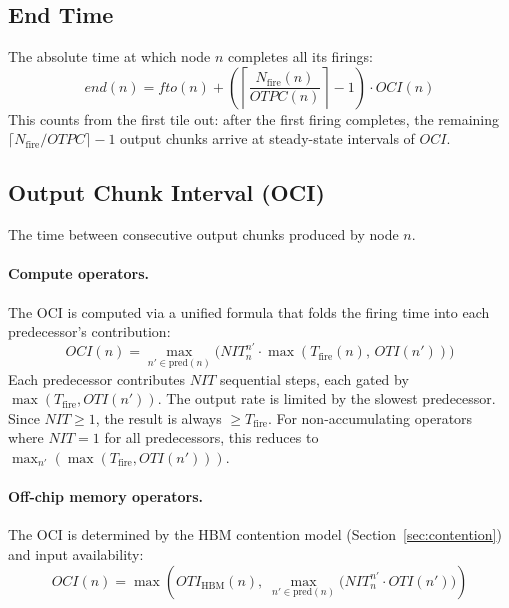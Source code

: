 \documentclass[10pt]{article}
\begin{document}
\subsection{End Time}

The absolute time at which node $n$ completes all its firings:
\begin{equation}
    \textit{end}(n) = \mathit{fto}(n) + \left(\left\lceil\frac{N_{\text{fire}}(n)}{\mathit{OTPC}(n)}\right\rceil - 1\right) \cdot \mathit{OCI}(n)
\end{equation}
This counts from the first tile out: after the first firing completes, the remaining $\lceil N_{\text{fire}} / \mathit{OTPC}\rceil - 1$ output chunks arrive at steady-state intervals of $\mathit{OCI}$.

\subsection{Output Chunk Interval (OCI)}

The time between consecutive output chunks produced by node $n$.

\paragraph{Compute operators.} The OCI is computed via a unified formula that folds the firing time into each predecessor's contribution:
\begin{equation}
    \mathit{OCI}(n) = \max_{n' \in \text{pred}(n)} \bigl(\mathit{NIT}^{n'}_n \cdot \max(T_{\text{fire}}(n),\, \mathit{OTI}(n'))\bigr)
    \label{eq:oci-compute}
\end{equation}
Each predecessor contributes $\mathit{NIT}$ sequential steps, each gated by $\max(T_{\text{fire}}, \mathit{OTI}(n'))$. The output rate is limited by the slowest predecessor. Since $\mathit{NIT} \geq 1$, the result is always $\geq T_{\text{fire}}$. For non-accumulating operators where $\mathit{NIT} = 1$ for all predecessors, this reduces to $\max_{n'}(\max(T_{\text{fire}}, \mathit{OTI}(n')))$.

\paragraph{Off-chip memory operators.} The OCI is determined by the HBM contention model (Section~\ref{sec:contention}) and input availability:
\begin{equation}
    \mathit{OCI}(n) = \max\!\left(\mathit{OTI}_{\text{HBM}}(n),\; \max_{n' \in \text{pred}(n)} \bigl(\mathit{NIT}^{n'}_n \cdot \mathit{OTI}(n')\bigr)\right)
\end{equation}
\end{document}
